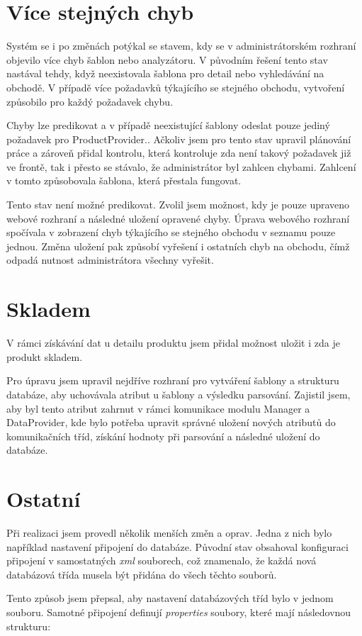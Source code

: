 \documentclass[thesis=B,czech]{FITthesis}[2012/06/26]
\begin{document}
\section{Více stejných chyb}
Systém se i po změnách potýkal se stavem, kdy se v administrátorském rozhraní objevilo více chyb šablon nebo analyzátoru.
V původním řešení tento stav nastával tehdy, když neexistovala šablona pro detail nebo vyhledávání na obchodě. 
V případě více požadavků týkajícího se stejného obchodu, vytvoření způsobilo pro každý požadavek chybu.
\par
Chyby lze predikovat a v případě neexistující šablony odeslat pouze jediný požadavek pro ProductProvider.. Ačkoliv jsem pro tento 
stav upravil plánování práce a zároveň přidal kontrolu, která kontroluje zda není takový požadavek již ve frontě, tak
i přesto se stávalo, že administrátor byl zahlcen chybami. Zahlcení v tomto způsobovala šablona, která přestala fungovat.
\par
Tento stav není možné predikovat. Zvolil jsem možnost, kdy je pouze upraveno webové rozhraní a následné uložení opravené chyby.
Úprava webového rozhraní spočívala v zobrazení chyb týkajícího se stejného obchodu v seznamu pouze jednou.
Změna uložení pak způsobí vyřešení i ostatních chyb na obchodu, čímž odpadá nutnost administrátora všechny vyřešit.

\section{Skladem}
V rámci získávání dat u detailu produktu jsem přidal možnost uložit i zda je produkt skladem.
\par
Pro úpravu jsem upravil nejdříve rozhraní pro vytváření šablony a strukturu databáze, aby uchovávala atribut u šablony a výsledku parsování.
Zajistil jsem, aby byl tento atribut zahrnut v rámci komunikace modulu Manager a DataProvider, kde bylo potřeba upravit
správné uložení nových atributů do komunikačních tříd, získání hodnoty při parsování a následné uložení do databáze.

\section{Ostatní}
Při realizaci jsem provedl několik menších změn a oprav. Jedna z nich bylo například nastavení 
připojení do databáze. Původní stav obsahoval konfiguraci  připojení v samostatných \textit{xml} souborech, což znamenalo, že každá nová databázová
třída musela být přidána do všech těchto souborů. 
\par
Tento způsob jsem přepsal, aby nastavení databázových tříd bylo v jednom souboru. Samotné připojení definují
\textit{properties} soubory, které mají následovnou strukturu:
\end{document}
